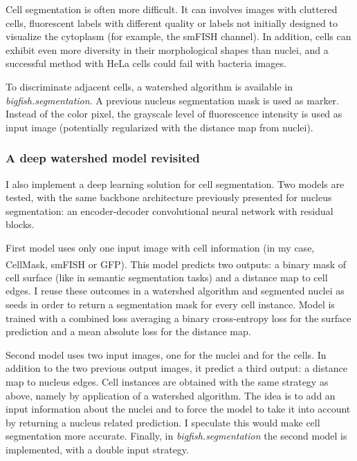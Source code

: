 Cell segmentation is often more difficult.
It can involves images with cluttered cells, fluorescent labels with different quality or labels not initially designed to visualize the cytoplasm (for example, the \ac{smFISH} channel).
In addition, cells can exhibit even more diversity in their morphological shapes than nuclei, and a successful method with HeLa cells could fail with bacteria images.

To discriminate adjacent cells, a watershed algorithm is available in \emph{bigfish.segmentation}.
A previous nucleus segmentation mask is used as marker.
Instead of the color pixel, the grayscale level of fluorescence intensity is used as input image (potentially regularized with the distance map from nuclei).

\subsubsection{A deep watershed model revisited}

I also implement a deep learning solution for cell segmentation.
Two models are tested, with the same backbone architecture previously presented for nucleus segmentation: an encoder-decoder convolutional neural network with residual blocks.

First model uses only one input image with cell information (in my case, CellMask\textsuperscript{\texttrademark}, \ac{smFISH} or \ac{GFP}).
This model predicts two outputs: a binary mask of cell surface (like in semantic segmentation tasks) and a distance map to cell edges.
I reuse these outcomes in a watershed algorithm and segmented nuclei as seeds in order to return a segmentation mask for every cell instance.
Model is trained with a combined loss averaging a binary cross-entropy loss for the surface prediction and a mean absolute loss for the distance map.

Second model uses two input images, one for the nuclei and for the cells.
In addition to the two previous output images, it predict a third output: a distance map to nucleus edges.
Cell instances are obtained with the same strategy as above, namely by application of a watershed algorithm.
The idea is to add an input information about the nuclei and to force the model to take it into account by returning a nucleus related prediction.
I speculate this would make cell segmentation more accurate.
Finally, in \emph{bigfish.segmentation} the second model is implemented, with a double input strategy.\\

